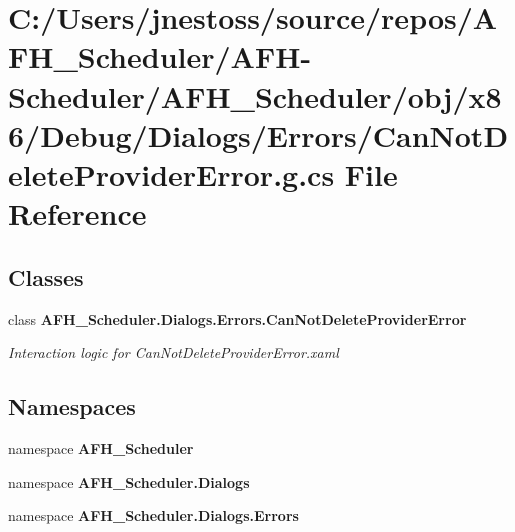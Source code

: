\section{C\+:/\+Users/jnestoss/source/repos/\+A\+F\+H\+\_\+\+Scheduler/\+A\+F\+H-\/\+Scheduler/\+A\+F\+H\+\_\+\+Scheduler/obj/x86/\+Debug/\+Dialogs/\+Errors/\+Can\+Not\+Delete\+Provider\+Error.g.\+cs File Reference}
\label{x86_2_debug_2_dialogs_2_errors_2_can_not_delete_provider_error_8g_8cs}
\subsection*{Classes}
\begin{DoxyCompactItemize}
\item 
class \textbf{ A\+F\+H\+\_\+\+Scheduler.\+Dialogs.\+Errors.\+Can\+Not\+Delete\+Provider\+Error}
\begin{DoxyCompactList}\small\item\em Interaction logic for Can\+Not\+Delete\+Provider\+Error.\+xaml \end{DoxyCompactList}\end{DoxyCompactItemize}
\subsection*{Namespaces}
\begin{DoxyCompactItemize}
\item 
namespace \textbf{ A\+F\+H\+\_\+\+Scheduler}
\item 
namespace \textbf{ A\+F\+H\+\_\+\+Scheduler.\+Dialogs}
\item 
namespace \textbf{ A\+F\+H\+\_\+\+Scheduler.\+Dialogs.\+Errors}
\end{DoxyCompactItemize}
